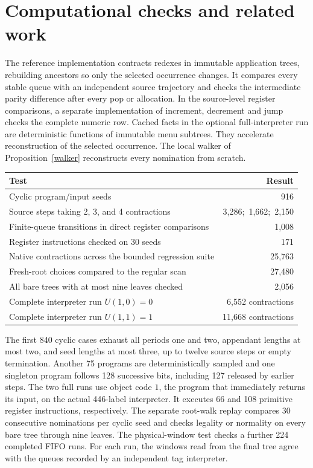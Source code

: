 \documentclass[11pt,letterpaper,oneside,reqno]{amsart}
\begin{document}

\section{Computational checks and related work}\label{sources}
The reference implementation contracts redexes in immutable application trees, rebuilding ancestors so only the selected occurrence changes. It compares every stable queue with an independent source trajectory and checks the intermediate parity difference after every pop or allocation. In the source-level register comparisons, a separate implementation of increment, decrement and jump checks the complete numeric row. Cached facts in the optional full-interpreter run are deterministic functions of immutable menu subtrees. They accelerate reconstruction of the selected occurrence. The local walker of Proposition~\ref{walker} reconstructs every nomination from scratch.

\begin{center}
\small
\begin{tabular}{@{}lr@{}}
\toprule
Test & Result\\
\midrule
Cyclic program/input seeds & 916\\
Source steps taking 2, 3, and 4 contractions & 3,286;\ 1,662;\ 2,150\\
Finite-queue transitions in direct register comparisons & 1,008\\
Register instructions checked on 30 seeds & 171\\
Native contractions across the bounded regression suite & 25,763\\
Fresh-root choices compared to the regular scan & 27,480\\
All bare trees with at most nine leaves checked & 2,056\\
Complete interpreter run \(U(1,0)=0\) & 6,552 contractions\\
Complete interpreter run \(U(1,1)=1\) & 11,668 contractions\\
\bottomrule
\end{tabular}
\end{center}
The first 840 cyclic cases exhaust all periods one and two, appendant lengths at most two, and seed lengths at most three, up to twelve source steps or empty termination. Another 75 programs are deterministically sampled and one singleton program follows 128 successive bits, including 127 released by earlier steps. The two full runs use object code \(1\), the program that immediately returns its input, on the actual 446-label interpreter. It executes 66 and 108 primitive register instructions, respectively. The separate root-walk replay compares 30 consecutive nominations per cyclic seed and checks legality or normality on every bare tree through nine leaves. The physical-window test checks a further 224 completed FIFO runs. For each run, the windows read from the final tree agree with the queues recorded by an independent tag interpreter.
\end{document}
